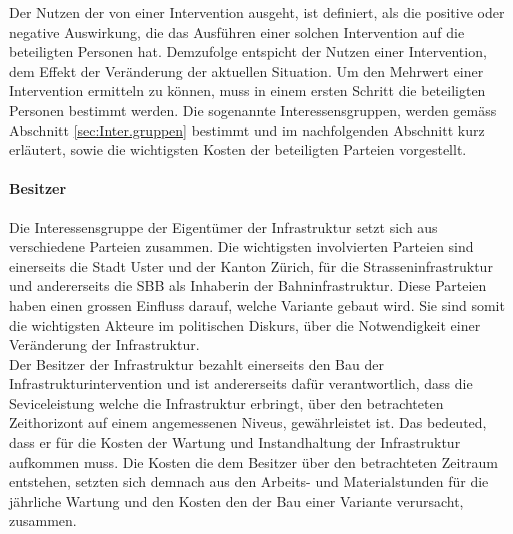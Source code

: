 %
%
%
%

\label{subsec:Gruppen}

Der Nutzen der von einer Intervention ausgeht, ist definiert, als die positive oder negative Auswirkung, die das Ausführen einer solchen Intervention auf die beteiligten Personen hat. Demzufolge entspicht der Nutzen einer Intervention, dem Effekt der Veränderung der aktuellen Situation. Um den Mehrwert einer Intervention ermitteln zu können, muss in einem ersten Schritt die beteiligten Personen bestimmt werden. Die sogenannte Interessensgruppen, werden gemäss Abschnitt \ref{sec:Inter.gruppen} bestimmt und im nachfolgenden Abschnitt kurz erläutert, sowie die wichtigsten Kosten der beteiligten Parteien vorgestellt.

\paragraph{Besitzer}

Die Interessensgruppe der Eigentümer der Infrastruktur setzt sich aus verschiedene Parteien zusammen. Die wichtigsten involvierten Parteien sind einerseits die Stadt Uster und der Kanton Zürich, für die Strasseninfrastruktur und andererseits die SBB als Inhaberin der Bahninfrastruktur. 
Diese Parteien haben einen grossen Einfluss darauf, welche Variante gebaut wird. Sie sind somit die wichtigsten Akteure im politischen Diskurs, über die Notwendigkeit einer Veränderung der Infrastruktur. \\ 
Der Besitzer der Infrastruktur bezahlt einerseits den Bau der Infrastrukturintervention und ist andererseits dafür verantwortlich, dass die Seviceleistung welche die Infrastruktur erbringt, über den betrachteten Zeithorizont auf einem angemessenen Niveus, gewährleistet ist. Das bedeuted, dass er für die Kosten der Wartung und Instandhaltung der Infrastruktur aufkommen muss. Die Kosten die dem Besitzer über den betrachteten Zeitraum entstehen, setzten sich demnach aus den Arbeits- und Materialstunden für die jährliche Wartung und den Kosten den der Bau einer Variante verursacht, zusammen. 


